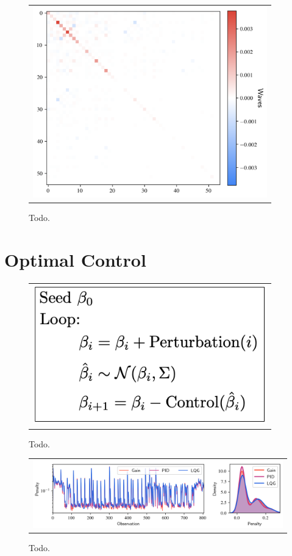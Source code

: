 \begin{figure}[!htbp]
\begin{center}
\begin{tabular}{c}
\includegraphics[width=4in]{figs/control/beta_cov_written_thesis.png}
\end{tabular}
\end{center}
\caption[Todo]{Todo.\label{fig:control-algo}}
\end{figure}

\section{Optimal Control}

\begin{figure}[!htbp]
\begin{center}
\begin{tabular}{c}
\includegraphics[width=4in]{figs/control/algo.png}
\end{tabular}
\end{center}
\caption[Todo]{Todo.\label{fig:control-algo}}
\end{figure}

\begin{figure}[!htbp]
\begin{center}
\begin{tabular}{c}
\includegraphics[width=\textwidth]{figs/control/control_results.png}
\end{tabular}
\end{center}
\caption[Todo]{Todo.\label{fig:control-results}}
\end{figure}
